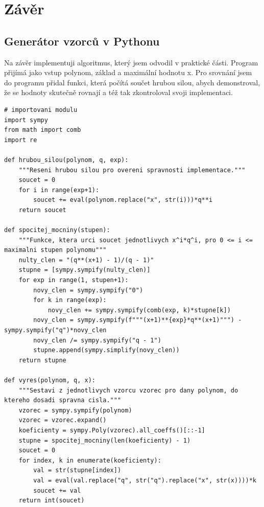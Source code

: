 \documentclass[12pt]{report}			%
\begin{document}
	\chapter*{Závěr}
	
	
		\lipsum[1]
	
	\nocite{*}
    \printbibliography					%
    \printglossary[title={Zkratky}]		%
    \listoffigures						%
    \listoftables						%

    \begin{appendices}
	\chapter{Generátor vzorců v Pythonu}	
	Na závěr implementuji algoritmus, který jsem odvodil v praktické části. Program přijímá jako vstup polynom, základ a maximální hodnotu x. Pro srovnání jsem do programu přidal funkci, která počítá součet hrubou silou, abych demonstroval, že se hodnoty skutečně rovnají a též tak zkontroloval svoji implementaci.

\begin{lstlisting}[title={Generator.py}, caption={generator.py}, label={lst:hello_world}]
# importovani modulu
import sympy
from math import comb
import re

def hrubou_silou(polynom, q, exp):
	"""Reseni hrubou silou pro overeni spravnosti implementace."""
    soucet = 0
    for i in range(exp+1):
        soucet += eval(polynom.replace("x", str(i)))*q**i
    return soucet

def spocitej_mocniny(stupen):
	"""Funkce, ktera urci soucet jednotlivych x^i*q^i, pro 0 <= i <= maximalni stupen polynomu""" 
    nulty_clen = "(q**(x+1) - 1)/(q - 1)"
    stupne = [sympy.sympify(nulty_clen)]
    for exp in range(1, stupen+1):
        novy_clen = sympy.sympify("0")
        for k in range(exp):
            novy_clen += sympy.sympify(comb(exp, k)*stupne[k])
        novy_clen = sympy.sympify(f"""(x+1)**{exp}*q**(x+1)""") - sympy.sympify("q")*novy_clen
        novy_clen /= sympy.sympify("q - 1")
        stupne.append(sympy.simplify(novy_clen))
    return stupne

def vyres(polynom, q, x):
	"""Sestavi z jednotlivych vzorcu vzorec pro dany polynom, do ktereho dosadi spravna cisla."""
    vzorec = sympy.sympify(polynom)
    vzorec = vzorec.expand()
    koeficienty = sympy.Poly(vzorec).all_coeffs()[::-1]
    stupne = spocitej_mocniny(len(koeficienty) - 1)
    soucet = 0
    for index, k in enumerate(koeficienty):
        val = str(stupne[index])
        val = eval(val.replace("q", str("q").replace("x", str(x))))*k
        soucet += val
    return int(soucet)


\end{lstlisting}
\end{appendices}
\end{document}
